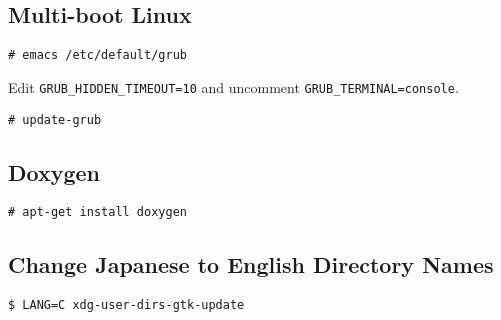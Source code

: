 \subsection{Multi-boot Linux}

\noindent
\begin{Sbox}
\begin{minipage}[t]{0.975\linewidth}
\begin{verbatim}
# emacs /etc/default/grub
\end{verbatim}
\end{minipage}
\end{Sbox}
\fbox{\TheSbox}

Edit \verb|GRUB_HIDDEN_TIMEOUT=10| and uncomment
\verb|GRUB_TERMINAL=console|.



\noindent
\begin{Sbox}
\begin{minipage}[t]{0.975\linewidth}
\begin{verbatim}
# update-grub
\end{verbatim}
\end{minipage}
\end{Sbox}
\fbox{\TheSbox}


\subsection{Doxygen}

\noindent
\begin{Sbox}
\begin{minipage}[t]{0.975\linewidth}
\begin{verbatim}
# apt-get install doxygen
\end{verbatim}
\end{minipage}
\end{Sbox}
\fbox{\TheSbox}



\subsection{Change Japanese to English Directory Names}

\noindent
\begin{Sbox}
\begin{minipage}[t]{0.975\linewidth}
\begin{verbatim}
$ LANG=C xdg-user-dirs-gtk-update
\end{verbatim}
\end{minipage}
\end{Sbox}
\fbox{\TheSbox}


